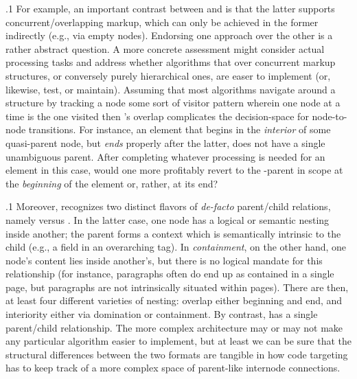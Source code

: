 \documentclass[11pt, twocolumn]{article}
\begin{document}
\p.1{%
For example, an important contrast between  and  is that
the latter supports concurrent/overlapping markup,
which can only be achieved in the former indirectly
(e.g., via empty  nodes). Endorsing one
approach over the other is a rather abstract question.
A more concrete assessment might consider actual processing
tasks and address whether algorithms that 
over concurrent markup structures, or conversely
purely hierarchical ones, are easer to implement (or,
likewise, test, or maintain).
Assuming that most algorithms navigate around a structure
by tracking a  node \mdash{} some sort of visitor
pattern wherein one node at a time is the one visited
\mdash{} then 's overlap complicates the decision-space
for node-to-node transitions. For instance, an element
that begins in the \textit{interior} of some quasi-parent node,
but \textit{ends} properly after the latter, does not have a
single unambiguous parent. After completing whatever
processing is needed for an element in this case, would one
more profitably revert to the -parent in scope
at the \textit{beginning} of the element or, rather, at its end?
}%

\p.1{%
Moreover,  recognizes two distinct flavors of \textit{de-facto}
parent/child relations, namely  versus
. In the latter case, one node has a
logical or semantic nesting inside another; the parent
forms a context which is semantically intrinsic to the
child (e.g., a  field in an overarching
 tag). In \textit{containment}, on the other
hand, one node's content lies inside another's, but
there is no logical mandate for this relationship
(for instance, paragraphs often do end up as contained
in a single  page, but paragraphs are not intrinsically
situated within pages). There are then, at least
four different varieties of nesting: overlap either
\visavis{} beginning and end, and interiority either
via domination or containment. By contrast,
 has a single parent/child relationship. The more
complex  architecture may or may not make
any particular algorithm easier to implement,
but at least we can be sure that the structural
differences between the two formats are tangible
in how code targeting  has to keep track of a
more complex space of parent-like internode connections.
}%
\end{document}
